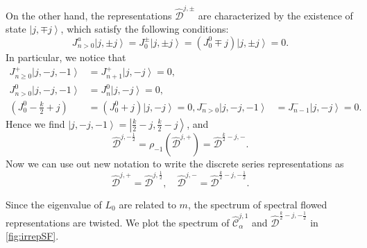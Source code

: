\documentclass[10pt,a4paper]{article}
\numberwithin{equation}{section}
\newcommand{\ket}[1]{\left| #1 \right\rangle}
\begin{document}
On the other hand, the representations $\hat{\mathcal{D}}^{j,\pm}$ are characterized by the existence of state $\ket{j,\mp j}$, 
which satisfy the following conditions:
\begin{equation}
    J^{a}_{n>0} \ket{j,\pm j} = J^{\pm}_{0} \ket{j,\pm j} = (J^{0}_{0} \mp j) \ket{j,\pm j} =0.
\end{equation}
In particular, we notice that 
\begin{equation}
    \begin{aligned}
        J^{+}_{n \geq 0} \ket{j,-j,-1} &= J^{+}_{n+1} \ket{j,-j}  = 0, \\
        J^{0}_{n > 0} \ket{j,-j,-1} & =  J^{0}_{n}\ket{j,-j} = 0,\\
        \left(J^{0}_{0} - \frac{k}{2} +j \right) & = \left( J^{0}_{0} + j \right) \ket{j,-j} = 0,
        J^{-}_{n>0} \ket{j,-j,-1} &= J^{-}_{n-1} \ket{j,-j}   =  0.
    \end{aligned}
\end{equation}
Hence we find $\ket{j,-j,-1} = \ket{\frac{k}{2}-j, \frac{k}{2}-j}$, and 
\begin{equation}
    \hat{\mathcal{D}}^{j,-\frac{1}{2}} = \rho_{-1} \left( \hat{\mathcal{D}}^{j,+} \right) = \hat{\mathcal{D}}^{\frac{k}{2}-j,-}.
\end{equation}
Now we can use out new notation to write the discrete series representations as 
\begin{equation}
    \widehat{\mathcal{D}}^{j,+} = \widehat{\mathcal{D}}^{j,\frac{1}{2}},\quad \widehat{\mathcal{D}}^{j,-} = \widehat{\mathcal{D}}^{\frac{k}{2}-j,-\frac{1}{2}}.
\end{equation}

Since the eigenvalue of $L_{0}$ are related to $m$, the spectrum of spectral flowed representations 
are twisted. We plot the spectrum of $\widehat{\mathcal{C}}^{j,1}_{\alpha}$ and $\widehat{\mathcal{D}}^{\frac{k}{2}-j, -\frac{1}{2}}$ 
in \ref{fig:irrepSF}.
\end{document}
